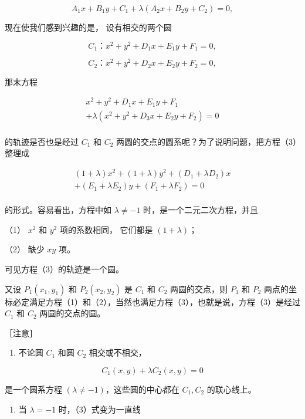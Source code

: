 \[
A_{1} x + B_{1} y + C_{1} + \lambda (A_{2} x + B_{2} y + C_{2}) = 0,
\]

现在使我们感到兴趣的是， 设有相交的两个圆

\[
C_{1}\text{：} x^{2} + y^{2} + D_{1} x + E_{1} y + F_{1} = 0, \tag {1}
\]

\[
C_{2}\text{：} x^{2} + y^{2} + D_{2} x + E_{2} y + F_{2} = 0, \tag {2}
\]

那末方程

\[
\begin{array}{l} x^{2} + y^{2} + D_{1} x + E_{1} y + F_{1} \\ + \lambda (x^{2} + y^{2} + D_{3} x + E_{2} y + F_{2}) = 0 \tag {3} \\ \end{array}
\]

的轨迹是否也是经过 \(C_1\) 和 \(C_2\)
两圆的交点的圆系呢？为了说明问题，把方程（3）整理成

\[
\begin{array}{l} (1 + \lambda) x^{2} + (1 + \lambda) y^{2} + \left(D_{1} + \lambda D_{2}\right) x \\ + \left(E_{1} + \lambda E_{2}\right) y + \left(F_{1} + \lambda F_{2}\right) = 0 \tag {4} \\ \end{array}
\]

的形式。容易看出，方程中如 \(\lambda \neq -1\)
时，是一个二元二次方程，并且

（1） \(x^{2}\) 和 \(y^{2}\) 项的系数相同， 它们都是 \((1 + \lambda)\)；

（2） 缺少 \(xy\) 项。

可见方程（3）的轨迹是一个圆。

又设 \(P_{1}(x_{1},y_{1})\) 和 \(P_{2}(x_{2},y_{2})\) 是 \(C_1\) 和
\(C_2\) 两圆的交点，则 \(P_{1}\) 和 \(P_{2}\)
两点的坐标必定满足方程（1）和（2），当然也满足方程（3），也就是说，方程（3）是经过
\(C_1\) 和 \(C_2\) 两圆的交点的圆。

［注意］

\begin{enumerate}
\def\labelenumi{\arabic{enumi}.}
\tightlist
\item
  不论圆 \(C_1\) 和圆 \(C_2\) 相交或不相交，
\end{enumerate}

\[
C_{1} (x, y) + \lambda C_{2} (x, y) = 0
\]

是一个圆系方程 \((\lambda \neq -1)\)，这些圆的中心都在 \(C_1, C_2\)
的联心线上。

\begin{enumerate}
\def\labelenumi{\arabic{enumi}.}
\setcounter{enumi}{1}
\tightlist
\item
  当 \(\lambda = -1\) 时，（3）式变为一直线
\end{enumerate}


